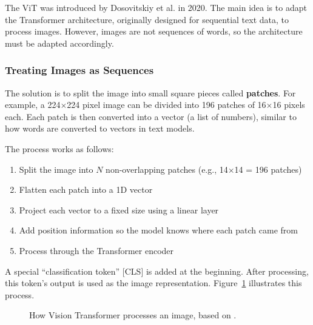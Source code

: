 \documentclass[
    english,
]{VUMIFPSbakalaurinis}
\begin{document}
The ViT was introduced by Dosovitskiy et al. \cite{Dos21} in 2020. The main idea is to adapt the Transformer architecture, originally designed for sequential text data, to process images. However, images are not sequences of words, so the architecture must be adapted accordingly.

\subsubsection{Treating Images as Sequences}

The solution is to split the image into small square pieces called \textbf{patches}. For example, a 224$\times$224 pixel image can be divided into 196 patches of 16$\times$16 pixels each. Each patch is then converted into a vector (a list of numbers), similar to how words are converted to vectors in text models.

The process works as follows:
\begin{enumerate}
    \item Split the image into $N$ non-overlapping patches (e.g., 14$\times$14 = 196 patches)
    \item Flatten each patch into a 1D vector
    \item Project each vector to a fixed size using a linear layer
    \item Add position information so the model knows where each patch came from
    \item Process through the Transformer encoder
\end{enumerate}

A special \enquote{classification token} [CLS] is added at the beginning. After processing, this token's output is used as the image representation. Figure~\ref{fig:vit} illustrates this process.

\begin{figure}[H]
\centering
{}
\caption{How Vision Transformer processes an image, based on \cite{Dos21}.}
\label{fig:vit}
\end{figure}
\end{document}
